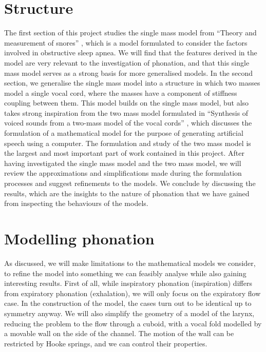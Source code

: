 \documentclass{book}
\begin{document}
\section{Structure}

The first section of this project studies the single mass model from ``Theory and measurement of snores'' \cite{gavriely_jensen_1993},
which is a model formulated to consider the factors involved in obstructive sleep apnea.
We will find that the features derived in the model are very relevant to the investigation of phonation,
and that this single mass model serves as a strong basis for more generalised models.
In the second section, we generalise the single mass model into a structure in which two masses model a single vocal cord,
where the masses have a component of stiffness coupling between them.
This model builds on the single mass model,
but also takes strong inspiration from the two mass model formulated in ``Synthesis of voiced sounds from a two-mass model of the vocal cords'' \cite{ishizaka_flanagan_1972},
which discusses the formulation of a mathematical model for the purpose of generating artificial speech using a computer.
The formulation and study of the two mass model is the largest and most important part of work contained in this project.
After having investigated the single mass model and the two mass model,
we will review the approximations and simplifications made during the formulation processes and suggest refinements to the models.
We conclude by discussing the results, which are the insights to the nature of phonation that we have gained from inspecting the behaviours of the models.

\section{Modelling phonation}

As discussed, we will make limitations to the mathematical models we consider,
to refine the model into something we can feasibly analyse while also gaining interesting results.
First of all, while inspiratory phonation (inspiration) differs from expiratory phonation (exhalation),
we will only focus on the expiratory flow case.
In the construction of the model, the cases turn out to be identical up to symmetry anyway.
We will also simplify the geometry of a model of the larynx,
reducing the problem to the flow through a cuboid, with a vocal fold modelled by a movable wall on the side of the channel.
The motion of the wall can be restricted by Hooke springs, and we can control their properties.
\end{document}
